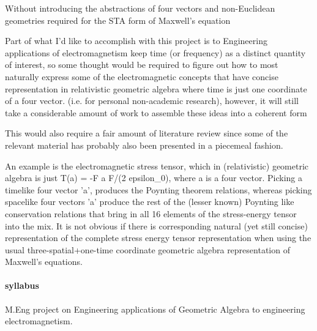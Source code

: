 Without introducing the abstractions of four vectors and non-Euclidean geometries required for the STA form of Maxwell's equation 

Part of what I'd like to accomplish with this project is to 
Engineering applications of electromagnetism keep time (or frequency) as a distinct quantity of interest, so some thought would be required to figure out how to most naturally express some of the electromagnetic concepts that have concise representation in relativistic geometric algebra where time is just one coordinate of a four vector.  
 (i.e. for personal non-academic research), however, it will still take a considerable amount of work to assemble these ideas into a coherent form

  This would also require a fair amount of literature review since some of the relevant material has probably also been presented in a piecemeal fashion.  

An example is the electromagnetic stress tensor, which in (relativistic) geometric algebra is just T(a) = -F a F/(2 epsilon_0), where a is a four vector.  Picking a timelike four vector 'a', produces the Poynting theorem relations, whereas picking spacelike four vectors 'a' produce the rest of the (lesser known) Poynting like conservation relations that bring in all 16 elements of the stress-energy tensor into the mix.  It is not obvious if there is corresponding natural (yet still concise) representation of the complete stress energy tensor representation when using the usual three-spatial+one-time coordinate geometric algebra representation of Maxwell's equations.


\paragraph{syllabus}

M.Eng project on Engineering applications of Geometric Algebra to engineering electromagnetism.
